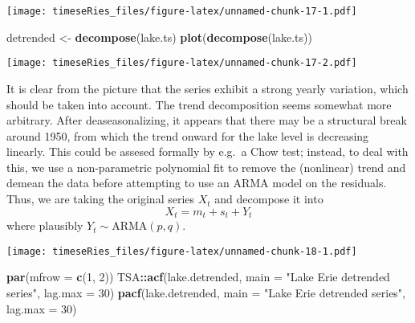 \documentclass[]{book}
\newenvironment{Shaded}{\begin{snugshade}}{\end{snugshade}}
\newcommand{\KeywordTok}[1]{\textcolor[rgb]{0.13,0.29,0.53}{\textbf{#1}}}
\newcommand{\DataTypeTok}[1]{\textcolor[rgb]{0.13,0.29,0.53}{#1}}
\newcommand{\DecValTok}[1]{\textcolor[rgb]{0.00,0.00,0.81}{#1}}
\newcommand{\StringTok}[1]{\textcolor[rgb]{0.31,0.60,0.02}{#1}}
\newcommand{\CommentTok}[1]{\textcolor[rgb]{0.56,0.35,0.01}{\textit{#1}}}
\newcommand{\OperatorTok}[1]{\textcolor[rgb]{0.81,0.36,0.00}{\textbf{#1}}}
\newcommand{\NormalTok}[1]{#1}
\begin{document}
\texttt{[image: timeseRies\_files/figure-latex/unnamed-chunk-17-1.pdf]}

\begin{Shaded}
\begin{Highlighting}[]
\NormalTok{detrended <-}\StringTok{ }\KeywordTok{decompose}\NormalTok{(lake.ts)}
\KeywordTok{plot}\NormalTok{(}\KeywordTok{decompose}\NormalTok{(lake.ts))}
\end{Highlighting}
\end{Shaded}

\texttt{[image: timeseRies\_files/figure-latex/unnamed-chunk-17-2.pdf]}

It is clear from the picture that the series exhibit a strong yearly
variation, which should be taken into account. The trend decomposition
seems somewhat more arbitrary. After deaseasonalizing, it appears that
there may be a structural break around 1950, from which the trend onward
for the lake level is decreasing linearly. This could be assesed
formally by e.g.~a Chow test; instead, to deal with this, we use a
non-parametric polynomial fit to remove the (nonlinear) trend and demean
the data before attempting to use an ARMA model on the residuals. Thus,
we are taking the original series \(X_t\) and decompose it into
\[X_t=m_t+s_t+Y_t\] where plausibly \(Y_t \sim \mathrm{ARMA}(p,q)\).

\begin{Shaded}
\end{Shaded}

\texttt{[image: timeseRies\_files/figure-latex/unnamed-chunk-18-1.pdf]}

\begin{Shaded}
\begin{Highlighting}[]
\KeywordTok{par}\NormalTok{(}\DataTypeTok{mfrow =} \KeywordTok{c}\NormalTok{(}\DecValTok{1}\NormalTok{, }\DecValTok{2}\NormalTok{))}
\NormalTok{TSA}\OperatorTok{::}\KeywordTok{acf}\NormalTok{(lake.detrended, }\DataTypeTok{main =} \StringTok{"Lake Erie detrended series"}\NormalTok{, }\DataTypeTok{lag.max =} \DecValTok{30}\NormalTok{)}
\KeywordTok{pacf}\NormalTok{(lake.detrended, }\DataTypeTok{main =} \StringTok{"Lake Erie detrended series"}\NormalTok{, }\DataTypeTok{lag.max =} \DecValTok{30}\NormalTok{)}
\end{Highlighting}
\end{Shaded}
\end{document}

